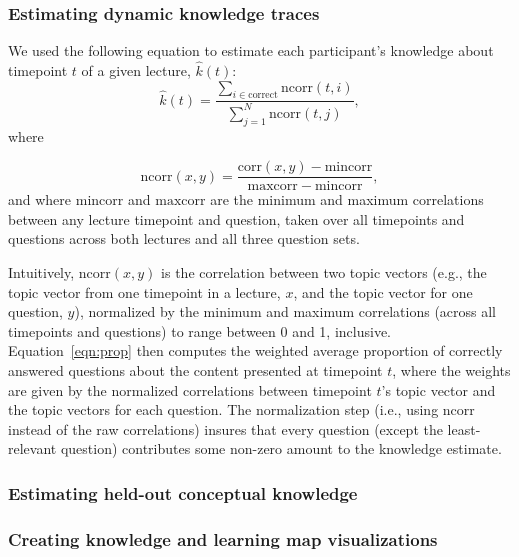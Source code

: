 \documentclass[10pt]{article}
\begin{document}
\subsubsection*{Estimating dynamic knowledge traces}

We used the following equation to estimate each participant's knowledge about
timepoint $t$ of a given lecture, $\hat{k}(t)$:
\begin{equation} 
    \hat{k}(t) = \frac{\sum_{i \in \mathrm{correct}}\mathrm{ncorr}(t, i)}{\sum_{j = 1}^N \mathrm{ncorr}(t, j)},
    \label{eqn:prop}
\end{equation}
where 

\begin{equation} 
    \mathrm{ncorr}(x, y) = \frac{\mathrm{corr}(x, y) - \mathrm{mincorr}}{\mathrm{maxcorr} - \mathrm{mincorr}},
\end{equation} 
and where $\mathrm{mincorr}$ and $\mathrm{maxcorr}$ are the minimum and maximum
correlations between any lecture timepoint and question, taken over all
timepoints and questions across both lectures and all three question sets.

Intuitively, $\mathrm{ncorr}(x, y)$ is the correlation between two topic
vectors (e.g., the topic vector from one timepoint in a lecture, $x$, and the
topic vector for one question, $y$), normalized by the minimum and maximum
correlations (across all timepoints and questions) to range between 0 and 1,
inclusive. Equation~\ref{eqn:prop} then computes the weighted average
proportion of correctly answered questions about the content presented at
timepoint $t$, where the weights are given by the normalized correlations
between timepoint $t$'s topic vector and the topic vectors for each question.
The normalization step (i.e., using $\mathrm{ncorr}$ instead of the raw
correlations) insures that every question (except the least-relevant question)
contributes some non-zero amount to the knowledge estimate.

\subsubsection*{Estimating held-out conceptual knowledge}

\subsubsection*{Creating knowledge and learning map visualizations}
\end{document}
